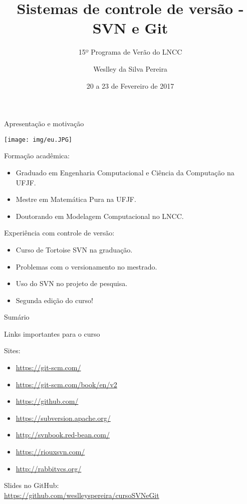 \documentclass[a4paper]{beamer}
\title[Sistemas de controle de versão]{
	\large{Sistemas de controle de versão - SVN e Git}
}
\subtitle{15º Programa de Verão do LNCC}
\author{Weslley da Silva Pereira}
\institute[LNCC]{Laboratório Nacional de Computação Científica}
\date[Verão LNCC 2017]{20 a 23 de Fevereiro de 2017}
\begin{document}
\begin{frame}
\titlepage
\end{frame}

\begin{frame}{Apresentação e motivação}

\begin{minipage}{.15\textwidth}
\centering
\texttt{[image: img/eu.JPG]}
\end{minipage}
\hfill
\begin{minipage}{.8\textwidth}

Formação acadêmica:
\begin{itemize}
\item Graduado em Engenharia Computacional e Ciência da Computação na UFJF.
\item Mestre em Matemática Pura na UFJF.
\item Doutorando em Modelagem Computacional no LNCC.
\end{itemize}
\pause

\vspace{10pt}
Experiência com controle de versão:
\begin{itemize}
\item Curso de Tortoise SVN na graduação.\pause
\item Problemas com o versionamento no mestrado.\pause
\item Uso do SVN no projeto de pesquisa.\pause
\item Segunda edição do curso!
\end{itemize}

\end{minipage}

\end{frame}

\begin{frame}{Sumário}
\tableofcontents
\end{frame}

\begin{frame}{Links importantes para o curso}

Sites:
\begin{itemize}
\item \url{https://git-scm.com/}
\item \url{https://git-scm.com/book/en/v2}
\item \url{https://github.com/}
\item \url{https://subversion.apache.org/}
\item \url{http://svnbook.red-bean.com/}
\item \url{https://riouxsvn.com/}
\item \url{http://rabbitvcs.org/}
\end{itemize}

\vspace{20pt}
Slides no GitHub:\\ \url{https://github.com/weslleyspereira/cursoSVNeGit}

\end{frame}
\end{document}
